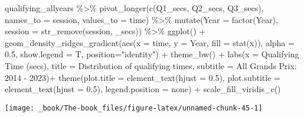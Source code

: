 \documentclass[
]{book}
\newenvironment{Shaded}{\begin{snugshade}}{\end{snugshade}}
\newcommand{\AttributeTok}[1]{\textcolor[rgb]{0.77,0.63,0.00}{#1}}
\newcommand{\FloatTok}[1]{\textcolor[rgb]{0.00,0.00,0.81}{#1}}
\newcommand{\FunctionTok}[1]{\textcolor[rgb]{0.00,0.00,0.00}{#1}}
\newcommand{\NormalTok}[1]{#1}
\newcommand{\SpecialCharTok}[1]{\textcolor[rgb]{0.00,0.00,0.00}{#1}}
\newcommand{\StringTok}[1]{\textcolor[rgb]{0.31,0.60,0.02}{#1}}
\begin{document}
\begin{Shaded}
\begin{Highlighting}[]
\NormalTok{qualifying\_allyears }\SpecialCharTok{\%\textgreater{}\%}
  \FunctionTok{pivot\_longer}\NormalTok{(}\FunctionTok{c}\NormalTok{(}\StringTok{\textquotesingle{}Q1\_secs\textquotesingle{}}\NormalTok{, }\StringTok{\textquotesingle{}Q2\_secs\textquotesingle{}}\NormalTok{, }\StringTok{\textquotesingle{}Q3\_secs\textquotesingle{}}\NormalTok{),}
               \AttributeTok{names\_to =} \StringTok{\textquotesingle{}session\textquotesingle{}}\NormalTok{,}
               \AttributeTok{values\_to =} \StringTok{\textquotesingle{}time\textquotesingle{}}\NormalTok{) }\SpecialCharTok{\%\textgreater{}\%}
  \FunctionTok{mutate}\NormalTok{(}\AttributeTok{Year =} \FunctionTok{factor}\NormalTok{(Year),}
         \AttributeTok{session =} \FunctionTok{str\_remove}\NormalTok{(session, }\StringTok{\textquotesingle{}\_secs\textquotesingle{}}\NormalTok{)) }\SpecialCharTok{\%\textgreater{}\%}
  \FunctionTok{ggplot}\NormalTok{() }\SpecialCharTok{+}
  \FunctionTok{geom\_density\_ridges\_gradient}\NormalTok{(}\FunctionTok{aes}\NormalTok{(}\AttributeTok{x =}\NormalTok{ time, }\AttributeTok{y =}\NormalTok{ Year, }\AttributeTok{fill =} \FunctionTok{stat}\NormalTok{(x)),}
                 \AttributeTok{alpha =} \FloatTok{0.5}\NormalTok{, }\AttributeTok{show.legend =}\NormalTok{ T,}
                 \AttributeTok{position=}\StringTok{"identity"}\NormalTok{) }\SpecialCharTok{+}
  \FunctionTok{theme\_bw}\NormalTok{() }\SpecialCharTok{+}
  \FunctionTok{labs}\NormalTok{(}\AttributeTok{x =} \StringTok{\textquotesingle{}Qualifying Time (secs)\textquotesingle{}}\NormalTok{,}
       \AttributeTok{title =} \StringTok{\textquotesingle{}Distribution of qualifying times\textquotesingle{}}\NormalTok{,}
       \AttributeTok{subtitle =} \StringTok{\textquotesingle{}All Grands Prix: 2014 {-} 2023\textquotesingle{}}\NormalTok{)}\SpecialCharTok{+}
  \FunctionTok{theme}\NormalTok{(}\AttributeTok{plot.title =} \FunctionTok{element\_text}\NormalTok{(}\AttributeTok{hjust =} \FloatTok{0.5}\NormalTok{),}
        \AttributeTok{plot.subtitle =} \FunctionTok{element\_text}\NormalTok{(}\AttributeTok{hjust =} \FloatTok{0.5}\NormalTok{),}
        \AttributeTok{legend.position =} \StringTok{\textquotesingle{}none\textquotesingle{}}\NormalTok{) }\SpecialCharTok{+}
  \FunctionTok{scale\_fill\_viridis\_c}\NormalTok{()}
\end{Highlighting}
\end{Shaded}

\begin{center}\texttt{[image: \_book/The-book\_files/figure-latex/unnamed-chunk-45-1]} \end{center}
\end{document}
